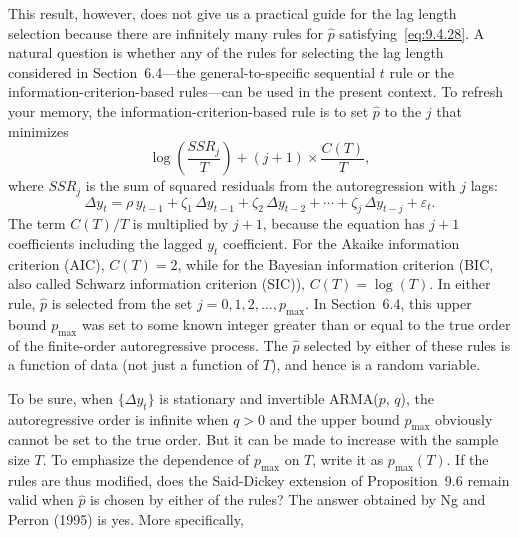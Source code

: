 This result, however, does not give us a practical guide for the lag length selection because there are infinitely many rules for $\hat{p}$ satisfying~\eqref{eq:9.4.28}. A natural
question is whether any of the rules for selecting the lag length considered in
Section~6.4---the general-to-specific sequential $t$ rule or the information-criterion-based rules---can be used in the present context. To refresh your memory, the
information-criterion-based rule is to set $\hat{p}$ to the $j$ that minimizes
\begin{equation}
\label{eq:9.4.29}
\log\!\left(\frac{SSR_j}{T}\right) + (j + 1) \times \frac{C(T)}{T},
\end{equation}
where $SSR_j$ is the sum of squared residuals from the autoregression with $j$ lags:
\begin{equation}
\label{eq:9.4.30}
\Delta y_t = \rho\, y_{t-1} + \zeta_1\,\Delta y_{t-1} + \zeta_2\,\Delta y_{t-2} + \cdots + \zeta_j\,\Delta y_{t-j} + \varepsilon_t.
\end{equation}
The term $C(T)/T$ is multiplied by $j + 1$, because the equation has $j + 1$ coefficients including the lagged $y_t$ coefficient. For the Akaike information criterion
(AIC), $C(T) = 2$, while for the Bayesian information criterion (BIC, also called
Schwarz information criterion (SIC)), $C(T) = \log(T)$. In either rule, $\hat{p}$ is selected
from the set $j = 0, 1, 2, \ldots, p_{\max}$. In Section~6.4, this upper bound $p_{\max}$ was set
to some known integer greater than or equal to the true order of the finite-order
autoregressive process. The $\hat{p}$ selected by either of these rules is a function of data
(not just a function of $T$), and hence is a random variable.

To be sure, when $\{\Delta y_t\}$ is stationary and invertible ARMA($p$, $q$), the autoregressive order is infinite when $q > 0$ and the upper bound $p_{\max}$ obviously cannot
be set to the true order. But it can be made to increase with the sample size $T$. To
emphasize the dependence of $p_{\max}$ on $T$, write it as $p_{\max}(T)$. If the rules are thus
modified, does the Said-Dickey extension of Proposition~9.6 remain valid when $\hat{p}$
is chosen by either of the rules? The answer obtained by Ng and Perron (1995) is
yes. More specifically,


